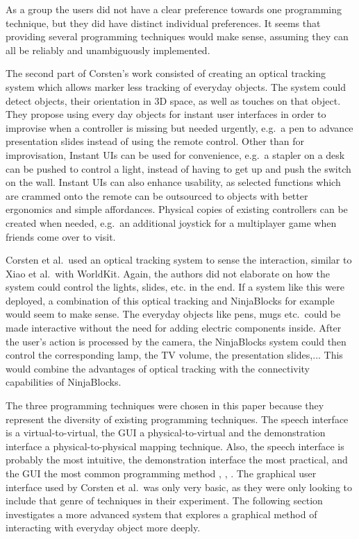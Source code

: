 As a group the users did not have a clear preference towards one programming technique, but they did have distinct individual preferences.
It seems that providing several programming techniques would make sense, assuming they can all be reliably and unambiguously implemented.

The second part of Corsten's work consisted of creating an optical tracking system which allows marker less tracking of everyday objects.
The system could detect objects, their orientation in 3D space, as well as touches on that object. 
They propose using every day objects for instant user interfaces in order to improvise when a controller is missing but needed urgently, e.g.\ a pen to advance presentation slides instead of using the remote control.
Other than for improvisation, Instant UIs can be used for convenience, e.g.\ a stapler on a desk can be pushed to control a light, instead of having to get up and push the switch on the wall.
Instant UIs can also enhance usability, as selected functions which are crammed onto the remote can be outsourced to objects with better ergonomics and simple affordances.
Physical copies of existing controllers can be created when needed, e.g.\ an additional joystick for a multiplayer game when friends come over to visit.

Corsten et al.\ used an optical tracking system to sense the interaction, similar to Xiao et al.\ with WorldKit.
Again, the authors did not elaborate on how the system could control the lights, slides, etc. in the end.
If a system like this were deployed, a combination of this optical tracking and NinjaBlocks for example would seem to make sense.
The everyday objects like pens, mugs etc.\ could be made interactive without the need for adding electric components inside. After the user's action is processed by the camera, the NinjaBlocks system could then control the corresponding lamp, the TV volume, the presentation slides,... This would combine the advantages of optical tracking with the connectivity capabilities of NinjaBlocks.

The three programming techniques were chosen in this paper because they represent the diversity of existing programming techniques.
The speech interface is a virtual-to-virtual, the GUI a physical-to-virtual and the demonstration interface a physical-to-physical mapping technique.
Also, the speech interface is probably the most intuitive, the demonstration interface the most practical, and the GUI the most common programming method \cite{heun2013reality}, \cite{cheng10}, \cite{mayer13}.
The graphical user interface used by Corsten et al.\ was only very basic, as they were only looking to include that genre of techniques in their experiment. 
The following section investigates a more advanced system that explores a graphical method of interacting with everyday object more deeply.


